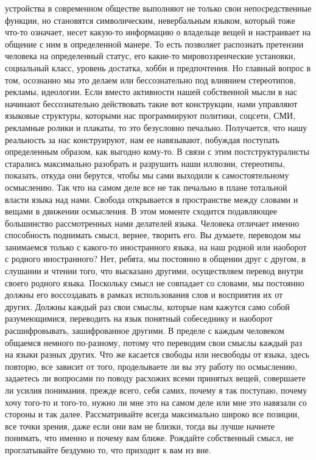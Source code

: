 устройства в современном обществе выполняют не только свои непосредственные
функции, но становятся символическим, невербальным языком, который тоже что-то
означает, несет какую-то информацию о владельце вещей и настраивает на общение с
ним в определенной манере. То есть позволяет распознать претензии человека на
определенный статус, его какие-то мировоззренческие установки, социальный класс,
уровень достатка, хобби и предпочтения. Но главный вопрос в том, осознанно мы
это делаем или бессознательно под влиянием стереотипов, рекламы, идеологии. Если
вместо активности нашей собственной мысли в нас начинают бессознательно
действовать такие вот конструкции, нами управляют языковые структуры, которыми
нас программируют политики, соцсети, СМИ, рекламные ролики и плакаты, то это
безусловно печально. Получается, что нашу реальность за нас конструируют, нам ее
навязывают, побуждая поступать определенным образом, как выгодно кому-то. В
связи с этим постструктуралисты старались максимально разобрать и разрушить наши
иллюзии, стереотипы, показать, откуда они берутся, чтобы мы сами выходили к
самостоятельному осмыслению. Так что на самом деле все не так печально в плане
тотальной власти языка над нами. Свобода открывается в пространстве между
словами и вещами в движении осмысления. В этом моменте сходится подавляющее
большинство рассмотренных нами делателей языка. Человека отличает именно
способность поднимать смысл, вернее, творить его. Вы думаете, переводом мы
занимаемся только с какого-то иностранного языка, на наш родной или наоборот с
родного иностранного? Нет, ребята, мы постоянно в общении друг с другом, в
слушании и чтении того, что высказано другими, осуществляем перевод внутри
своего родного языка. Поскольку смысл не совпадает со словами, мы постоянно
должны его воссоздавать в рамках использования слов и восприятия их от других.
Должны каждый раз свои смыслы, которые нам кажутся само собой разумеющимися,
переводить на язык понятный собеседнику и наоборот расшифровывать, зашифрованное
другими. В пределе с каждым человеком общаемся немного по-разному, потому что
переводим свои смыслы каждый раз на языки разных других. Что же касается свободы
или несвободы от языка, здесь повторю, все зависит от того, проделываете ли вы
эту работу по осмыслению, задаетесь ли вопросами по поводу расхожих всеми
принятых вещей, совершаете ли усилия понимания, прежде всего, себя самих, почему
я так поступаю, почему хочу того-то и того-то, нужно ли мне это на самом деле
или мне это навязали со стороны и так далее. Рассматривайте всегда максимально
широко все позиции, все точки зрения, даже если они вам не близки, тогда вы
лучше начнете понимать, что именно и почему вам ближе. Рождайте собственный
смысл, не проглатывайте бездумно то, что приходит к вам из вне.